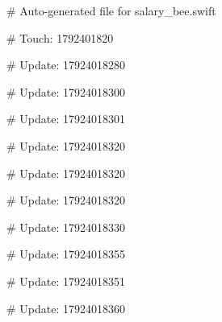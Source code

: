 # Auto-generated file for salary_bee.swift

# Touch: 1792401820

# Update: 17924018280

# Update: 17924018300

# Update: 17924018301

# Update: 17924018320

# Update: 17924018320

# Update: 17924018320

# Update: 17924018330

# Update: 17924018355

# Update: 17924018351

# Update: 17924018360
